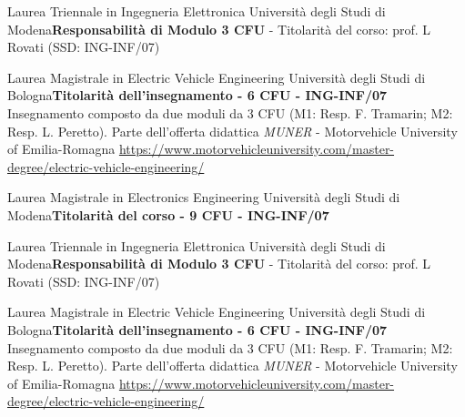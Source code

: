 {
{\newline Laurea Triennale in Ingegneria Elettronica}
{Università degli Studi di Modena}{\newline \textbf{Responsabilità di Modulo 3 CFU} - Titolarità del corso: prof. L Rovati (SSD: ING-INF/07)}{}

{Laurea Magistrale in Electric Vehicle Engineering}
{Università degli Studi di Bologna}{\newline \textbf{Titolarità dell'insegnamento - 6 CFU - ING-INF/07}}{
    Insegnamento composto da due moduli da 3 CFU (M1: Resp. F. Tramarin; M2: Resp. L. Peretto).\newline
    Parte dell'offerta didattica \textit{MUNER} - Motorvehicle University of Emilia-Romagna \newline \href{https://www.motorvehicleuniversity.com/master-degree/electric-vehicle-engineering/}{https://www.motorvehicleuniversity.com/master-degree/electric-vehicle-engineering/}}

{\newline Laurea Magistrale in Electronics Engineering}
{Università degli Studi di Modena}{\newline \textbf{Titolarità del corso - 9 CFU - ING-INF/07}}{}

{\newline Laurea Triennale in Ingegneria Elettronica}
{Università degli Studi di Modena}{\newline \textbf{Responsabilità di Modulo 3 CFU} - Titolarità del corso: prof. L Rovati (SSD: ING-INF/07)}{}

{Laurea Magistrale in Electric Vehicle Engineering}
{Università degli Studi di Bologna}{\newline \textbf{Titolarità dell'insegnamento - 6 CFU - ING-INF/07}}{
    Insegnamento composto da due moduli da 3 CFU (M1: Resp. F. Tramarin; M2: Resp. L. Peretto).\newline
    Parte dell'offerta didattica \textit{MUNER} - Motorvehicle University of Emilia-Romagna \newline \href{https://www.motorvehicleuniversity.com/master-degree/electric-vehicle-engineering/}{https://www.motorvehicleuniversity.com/master-degree/electric-vehicle-engineering/}}

}
